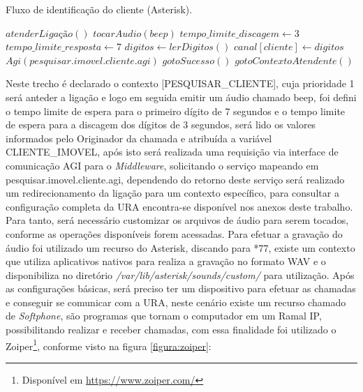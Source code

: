 
\begin{algorithm}
	\caption{Fluxo de identificação do cliente (Asterisk).}	
	\label{algoritmo:FluxoIdentificaoCliente}
	\begin{algorithmic}[1]
		\STATE $atenderLigação()$ 
		\STATE $tocarAudio(beep)$   
		\STATE $tempo\_limite\_discagem \gets 3$  		 
		\STATE $tempo\_limite\_resposta \gets 7$  
		\STATE $digitos  \gets lerDigitos()$  
		\STATE $canal [cliente]  \gets digitos$   
		\STATE $Agi(pesquisar.imovel.cliente.agi)$  
		\STATE $gotoSucesso()$  
		\ELSE
		\STATE $ gotoContextoAtendente()$  
		\ENDIF		
	\end{algorithmic}
\end{algorithm}


Neste trecho é declarado o contexto [PESQUISAR\_CLIENTE], cuja prioridade 1 será anteder a ligação e logo em seguida emitir um áudio chamado beep, foi defini o tempo limite de espera para o primeiro dígito de 7 segundos e o tempo limite de espera para a discagem dos dígitos de 3 segundos, será lido os valores informados pelo Originador da chamada e atribuída a variável CLIENTE\_IMOVEL, após isto será realizada uma requisição via interface de comunicação  AGI para o \textit{Middleware}, solicitando o serviço mapeando em pesquisar.imovel.cliente.agi, dependendo do retorno deste serviço será realizado um redirecionamento da ligação para um contexto específico, para consultar a configuração completa da URA encontra-se disponível nos anexos deste trabalho.
Para tanto, será necessário customizar os arquivos de áudio para serem tocados, conforme as operações disponíveis forem acessadas. Para efetuar a gravação do áudio foi utilizado um recurso do Asterisk, discando para *77, existe um contexto que utiliza aplicativos nativos para realiza a gravação no formato WAV e o disponibiliza no diretório \textit{/var/lib/asterisk/sounds/custom/} para utilização.
Após as configurações básicas, será preciso ter um dispositivo para efetuar as chamadas e conseguir se comunicar com a URA, neste cenário existe um recurso chamado de \textit{Softphone}, são programas que tornam o computador em um Ramal IP, possibilitando realizar e receber chamadas, com essa finalidade foi utilizado o Zoiper\footnote{Disponível em \url{https://www.zoiper.com/}}, conforme visto na figura \ref{figura:zoiper}:


